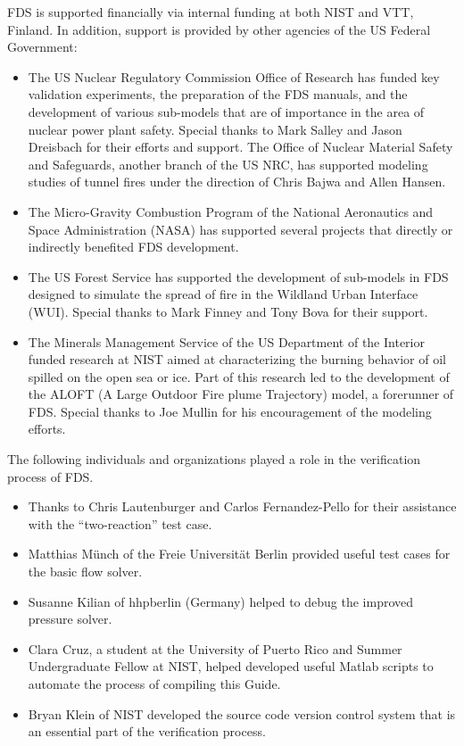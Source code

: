 \documentclass[11pt]{book}
\begin{document}
FDS is supported financially via internal funding at both NIST and
VTT, Finland. In addition, support is provided by other agencies of
the US Federal Government:
\begin{itemize}
\item The US Nuclear Regulatory Commission Office of Research has funded key
validation experiments, the preparation of the FDS manuals, and the
development of various sub-models that are of importance in the area
of nuclear power plant safety. Special thanks to Mark Salley and Jason
Dreisbach for their efforts and support.  The Office of Nuclear
Material Safety and Safeguards, another branch of the US NRC, has
supported modeling studies of tunnel fires under the direction of
Chris Bajwa and Allen Hansen.
\item The Micro-Gravity Combustion Program of the National Aeronautics and Space
Administration (NASA) has supported several projects that directly or indirectly benefited FDS development.
\item The US Forest Service has supported the development of sub-models in FDS designed to simulate the spread of
fire in the Wildland Urban Interface (WUI). Special thanks to Mark Finney and Tony Bova for their support.
\item The Minerals Management Service of the US Department of the Interior funded research at NIST aimed at
characterizing the burning behavior of oil spilled on the open sea or ice. Part of this research led to the development
of the ALOFT (A Large Outdoor Fire plume Trajectory) model, a forerunner of FDS. Special thanks to Joe Mullin for his
encouragement of the modeling efforts.
\end{itemize}
\noindent The following individuals and organizations played a role in the verification process of FDS.
\begin{itemize}
\item Thanks to Chris Lautenburger and Carlos Fernandez-Pello for their assistance with the ``two-reaction'' test case.
\item Matthias M\"{u}nch of the Freie Universit\"{a}t Berlin provided useful test cases for the basic flow solver.
\item Susanne Kilian of hhpberlin (Germany) helped to debug the improved pressure solver.
\item Clara Cruz, a student at the University of Puerto Rico and Summer Undergraduate Fellow at NIST, helped developed useful Matlab scripts to automate
the process of compiling this Guide.
\item Bryan Klein of NIST developed the source code version control system that is an essential part of the verification process.
\end{itemize}
\end{document}
